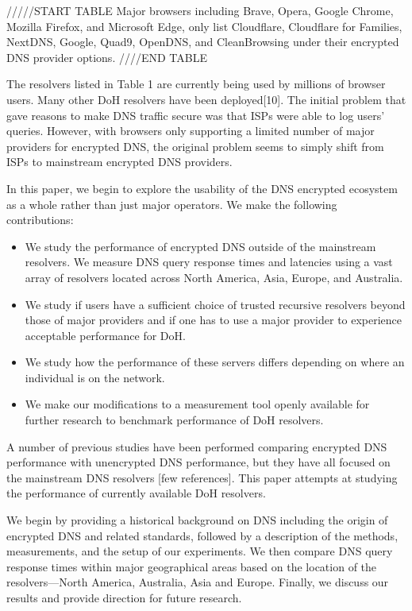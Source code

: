 /////START TABLE
Major browsers including Brave, Opera, Google Chrome, Mozilla Firefox, and Microsoft Edge, only list Cloudflare, Cloudflare for Families, NextDNS, Google, Quad9, OpenDNS, and CleanBrowsing under their encrypted DNS provider options.
////END TABLE

The resolvers listed in Table 1 are currently being used by millions of browser users.
Many other DoH resolvers have been deployed[10].
The initial problem that gave reasons to make DNS traffic secure was that ISPs were able to log users' queries.
However, with browsers only supporting a limited number of major providers for encrypted DNS, the original problem seems to simply shift from ISPs to mainstream encrypted DNS providers.

In this paper, we begin to explore the usability of the DNS encrypted ecosystem as a whole rather than just major operators. We make the following contributions:
\begin{itemize}
\setlength\itemsep{0em}
\item We study the performance of encrypted DNS outside of the mainstream resolvers. We measure DNS query response times and latencies using a vast array of resolvers located across North America, Asia, Europe, and Australia. 
\item We study if users have a sufficient choice of trusted recursive resolvers beyond those of major providers and if one has to use a major provider to experience acceptable performance for DoH. 
\item We study how the performance of these servers differs depending on where an individual is on the network.
\item We make our modifications to a measurement tool openly available for further research to benchmark performance of DoH resolvers.
\end{itemize}

A number of previous studies have been performed comparing encrypted DNS performance with unencrypted DNS performance, but they have all focused on the mainstream DNS resolvers [few references].
This paper attempts at studying the performance of currently available DoH resolvers.

We begin by providing a historical background on DNS including the origin of encrypted DNS and related standards, followed by a description of the methods, measurements, and the setup of our experiments.
We then compare DNS query response times within major geographical areas based on the location of the resolvers—North America, Australia, Asia and Europe.
Finally, we discuss our results and provide direction for future research.